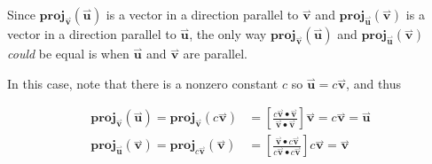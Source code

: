 \documentclass{ximera}
\begin{document}
\begin{exercise}
\begin{selectAll}
\begin{hint}
\begin{problem}
\begin{question}
\begin{itemize}
Since $\mathbf{proj}_{\overset{\boldsymbol{\rightharpoonup}}{\mathbf{v}}}(\overset{\boldsymbol{\rightharpoonup}}{\mathbf{u}})$ is a vector in a direction parallel to $\overset{\boldsymbol{\rightharpoonup}}{\mathbf{v}}$ and $\mathbf{proj}_{\overset{\boldsymbol{\rightharpoonup}}{\mathbf{u}}}(\overset{\boldsymbol{\rightharpoonup}}{\mathbf{v}})$ is a vector in a direction parallel to $\overset{\boldsymbol{\rightharpoonup}}{\mathbf{u}}$, the only way  $\mathbf{proj}_{\overset{\boldsymbol{\rightharpoonup}}{\mathbf{v}}}(\overset{\boldsymbol{\rightharpoonup}}{\mathbf{u}})$ and $\mathbf{proj}_{\overset{\boldsymbol{\rightharpoonup}}{\mathbf{u}}}(\overset{\boldsymbol{\rightharpoonup}}{\mathbf{v}})$ \emph{could} be equal is when $\overset{\boldsymbol{\rightharpoonup}}{\mathbf{u}}$ and $\overset{\boldsymbol{\rightharpoonup}}{\mathbf{v}}$ are parallel.

In this case, note that there is a nonzero constant $c$ so $\overset{\boldsymbol{\rightharpoonup}}{\mathbf{u}} = c \overset{\boldsymbol{\rightharpoonup}}{\mathbf{v}}$, and thus

\begin{align*}
\mathbf{proj}_{\overset{\boldsymbol{\rightharpoonup}}{\mathbf{v}}}(\overset{\boldsymbol{\rightharpoonup}}{\mathbf{u}}) = \mathbf{proj}_{\overset{\boldsymbol{\rightharpoonup}}{\mathbf{v}}}(c\overset{\boldsymbol{\rightharpoonup}}{\mathbf{v}}) &=\left[\frac{c\overset{\boldsymbol{\rightharpoonup}}{\mathbf{v}} \bullet \overset{\boldsymbol{\rightharpoonup}}{\mathbf{v}}}{\overset{\boldsymbol{\rightharpoonup}}{\mathbf{v}} \bullet \overset{\boldsymbol{\rightharpoonup}}{\mathbf{v}}}\right] \overset{\boldsymbol{\rightharpoonup}}{\mathbf{v}} = c \overset{\boldsymbol{\rightharpoonup}}{\mathbf{v}} = \overset{\boldsymbol{\rightharpoonup}}{\mathbf{u}}\\
\mathbf{proj}_{\overset{\boldsymbol{\rightharpoonup}}{\mathbf{u}}}(\overset{\boldsymbol{\rightharpoonup}}{\mathbf{v}}) = \mathbf{proj}_{c\overset{\boldsymbol{\rightharpoonup}}{\mathbf{v}}}(\overset{\boldsymbol{\rightharpoonup}}{\mathbf{v}}) &= \left[\frac{\overset{\boldsymbol{\rightharpoonup}}{\mathbf{v}} \bullet c\overset{\boldsymbol{\rightharpoonup}}{\mathbf{v}}}{c\overset{\boldsymbol{\rightharpoonup}}{\mathbf{v}} \bullet c\overset{\boldsymbol{\rightharpoonup}}{\mathbf{v}}}\right] c \overset{\boldsymbol{\rightharpoonup}}{\mathbf{v}} = \overset{\boldsymbol{\rightharpoonup}}{\mathbf{v}}\\
\end{align*}


\end{itemize}
\end{question}
\end{problem}
\end{hint}
\end{selectAll}
\end{exercise}
\end{document}
